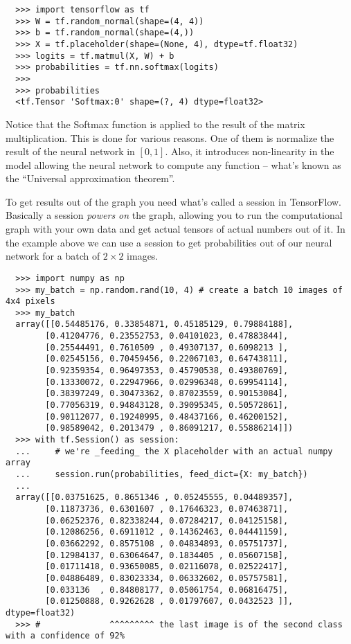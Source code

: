 \begin{verbatim}
  >>> import tensorflow as tf
  >>> W = tf.random_normal(shape=(4, 4))
  >>> b = tf.random_normal(shape=(4,))
  >>> X = tf.placeholder(shape=(None, 4), dtype=tf.float32)
  >>> logits = tf.matmul(X, W) + b
  >>> probabilities = tf.nn.softmax(logits)
  >>>
  >>> probabilities
  <tf.Tensor 'Softmax:0' shape=(?, 4) dtype=float32>
\end{verbatim}

Notice that the Softmax function is applied to the result of the matrix
multiplication. This is done for various reasons. One of them is
normalize the result of the neural network in $[0, 1]$. Also, it
introduces non-linearity in the model allowing the neural network to
compute any function -- what's known as the ``Universal approximation
theorem''.

To get results out of the graph you need what's called a session in
TensorFlow. Basically a session \emph{powers on} the graph, allowing
you to run the computational graph with your own data and get actual
tensors of actual numbers out of it. In the example above we can use a
session to get probabilities out of our neural network for a batch of
\( 2 \times 2 \) images.

\begin{verbatim}
  >>> import numpy as np
  >>> my_batch = np.random.rand(10, 4) # create a batch 10 images of 4x4 pixels
  >>> my_batch
  array([[0.54485176, 0.33854871, 0.45185129, 0.79884188],
        [0.41204776, 0.23552753, 0.04101023, 0.47883844],
        [0.25544491, 0.7610509 , 0.49307137, 0.6098213 ],
        [0.02545156, 0.70459456, 0.22067103, 0.64743811],
        [0.92359354, 0.96497353, 0.45790538, 0.49380769],
        [0.13330072, 0.22947966, 0.02996348, 0.69954114],
        [0.38397249, 0.30473362, 0.87023559, 0.90153084],
        [0.77056319, 0.94843128, 0.39095345, 0.50572861],
        [0.90112077, 0.19240995, 0.48437166, 0.46200152],
        [0.98589042, 0.2013479 , 0.86091217, 0.55886214]])
  >>> with tf.Session() as session:
  ...     # we're _feeding_ the X placeholder with an actual numpy array
  ...     session.run(probabilities, feed_dict={X: my_batch})
  ...
  array([[0.03751625, 0.8651346 , 0.05245555, 0.04489357],
        [0.11873736, 0.6301607 , 0.17646323, 0.07463871],
        [0.06252376, 0.82338244, 0.07284217, 0.04125158],
        [0.12086256, 0.6911012 , 0.14362463, 0.04441159],
        [0.03662292, 0.8575108 , 0.04834893, 0.05751737],
        [0.12984137, 0.63064647, 0.1834405 , 0.05607158],
        [0.01711418, 0.93650085, 0.02116078, 0.02522417],
        [0.04886489, 0.83023334, 0.06332602, 0.05757581],
        [0.033136  , 0.84808177, 0.05061754, 0.06816475],
        [0.01250888, 0.9262628 , 0.01797607, 0.0432523 ]], dtype=float32)
  >>> #              ^^^^^^^^^ the last image is of the second class with a confidence of 92%
\end{verbatim}

